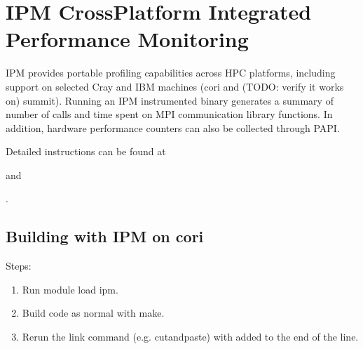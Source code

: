 \documentclass[letterpaper,10pt,english]{sphinxmanual}
\begin{document}
\section{IPM \sphinxhyphen{} Cross\sphinxhyphen{}Platform Integrated Performance Monitoring}
\label{\detokenize{External_Profiling_Tools:ipm-cross-platform-integrated-performance-monitoring}}
\sphinxAtStartPar
IPM provides portable profiling capabilities across HPC platforms, including
support on selected Cray and IBM machines (cori and (TODO: verify it works on)
summit). Running an IPM instrumented binary generates a summary of number of
calls and time spent on MPI communication library functions. In addition,
hardware performance counters can also be collected through PAPI.

\sphinxAtStartPar
Detailed instructions can be found at  \sphinxstepexplicit %
\begin{footnote}[4]\label{\thesphinxscope.4}%
\sphinxAtStartFootnote
{}
%
\end{footnote} and \sphinxstepexplicit %
\begin{footnote}[5]\label{\thesphinxscope.5}%
\sphinxAtStartFootnote
{}
%
\end{footnote}.


\subsection{Building with IPM on cori}
\label{\detokenize{External_Profiling_Tools:building-with-ipm-on-cori}}
\sphinxAtStartPar
Steps:
\begin{enumerate}
%
\item {} 
\sphinxAtStartPar
Run module load ipm.

\item {} 
\sphinxAtStartPar
Build code as normal with make.

\item {} 
\sphinxAtStartPar
Re\sphinxhyphen{}run the link command (e.g. cut\sphinxhyphen{}and\sphinxhyphen{}paste) with  added to the end of the line.

\end{enumerate}
\end{document}
